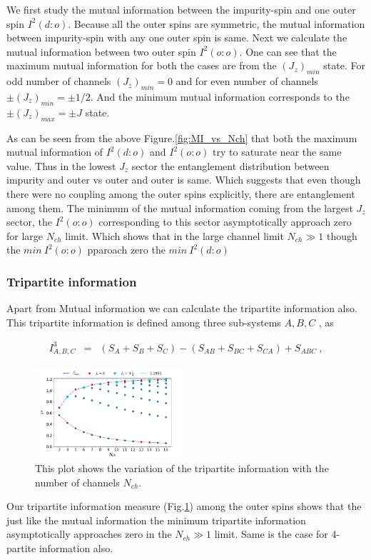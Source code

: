 \documentclass[reprint,prb,superscriptaddress]{revtex4-2}
\begin{document}
We first study the mutual information between the impurity-spin and one outer spin $I^2(d:o)$. Because all the outer spins are symmetric, the mutual information between impurity-spin with any one outer spin is same. Next we calculate the mutual information between two outer spin $I^2(o:o)$. One can see that the maximum mutual information for both the cases are from the $(J_z)_{min}$ state. For odd number of channels $(J_z)_{min}=0$ and for even number of channels $\pm (J_z)_{min}=\pm 1/2$. And the minimum mutual information corresponds to the $\pm (J_z)_{max}=\pm J$ state.\\

\par As can be seen from the above Figure.\ref{fig:MI_vs_Nch} that  both the maximum mutual information of $I^2(d:o)$ and $I^2(o:o)$ try to saturate near the same value. Thus in the lowest $J_z$ sector the entanglement distribution between impurity and outer vs outer and outer is same. Which suggests that even though there were no coupling among the outer spins explicitly, there are entanglement among them. The minimum of the mutual information coming from the largest $J_z$ sector, the $I^2(o:o)$ corresponding to this sector asymptotically approach zero for large $N_{ch}$ limit. Which shows that in the large channel limit $N_{ch}\gg 1$ though the $min~I^2(o:o)$ pparoach zero the $min~ I^2(d:o)$ 

\subsubsection{Tripartite information}
\noindent Apart from Mutual information we can calculate the tripartite information also. This tripartite information is defined among three sub-systems $A,B,C$ , as 

\begin{eqnarray}
I^3_{A,B,C} &=& (S_A+S_B+S_C)-(S_{AB}+S_{BC}+S_{CA})+S_{ABC}~,
\end{eqnarray}

\begin{figure}[!ht]
\hspace*{-15pt}
\includegraphics[width=0.5\textwidth]{plt/I_3_vs_Nch_1_2_3}
\caption{This plot shows the variation of the tripartite information with the number of channels $N_{ch}$.}
\label{fig:I3_vs_Nch}
\end{figure}
\noindent Our tripartite information measure (Fig.\ref{fig:I3_vs_Nch}) among the outer spins shows that the just like the mutual information the minimum tripartite information asymptotically approaches zero in the $N_{ch}\gg 1$ limit. Same is the case for 4-partite information also.
\end{document}
